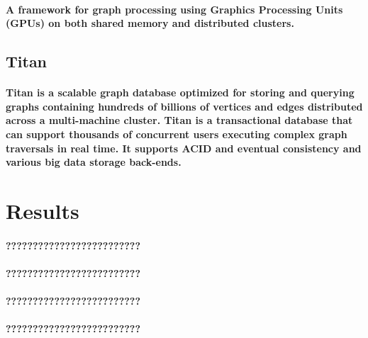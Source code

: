 \documentclass{acm_proc_article-sp}
\begin{document}
\paragraph{A framework for graph processing using Graphics Processing Units (GPUs) on both shared memory and distributed clusters.\cite{zhong2014medusa}}
\subsection{Titan}
\paragraph{Titan is a scalable graph database optimized for storing and querying graphs containing hundreds of billions of vertices and edges distributed across a multi-machine cluster. Titan is a transactional database that can support thousands of concurrent users executing complex graph traversals in real time. It supports ACID and eventual consistency and various big data storage back-ends.\cite{chang1997titan}}
\pagebreak
\section{Results}
\paragraph{?????????????????????????}
\paragraph{?????????????????????????}
\paragraph{?????????????????????????}
\paragraph{?????????????????????????}
\pagebreak


\end{document}
